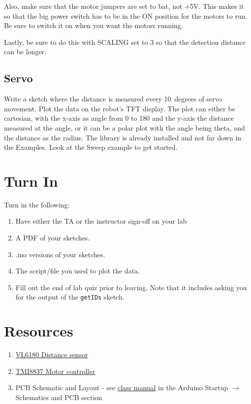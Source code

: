 Also, make sure that the motor jumpers are set to bat, not +5V. This makes it so that 
the big power switch has to be in the ON position for the motors to run. Be sure to 
switch it on when you want the motors running. 

Lastly, be sure to do this with SCALING set to 3 so that the detection distance can 
be longer.

\subsection{Servo}
Write a sketch where the distance is measured every 10~degrees of servo movement. Plot the
data on the robot's TFT display. The plot can either be cartesian, with the x-axis as angle
from 0 to 180 and the y-axis the distance measured at the angle, or it can be a polar plot 
with the angle being theta, and the distance as the radius. The \lstinline@Servo@ library 
is already installed and not far down in the Examples. Look at the Sweep example to get started.


\section{Turn In}
Turn in the following:
\begin{enumerate}
    \item Have either the TA or the instructor sign-off on your lab
    \item A PDF of your sketches.
    \item .ino versions of your sketches.
    \item The script/file you used to plot the data.
    \item Fill out the end of lab quiz prior to leaving. Note that it includes asking you 
            for the output of the \lstinline$getIDs$ sketch. 
\end{enumerate}

\section{Resources}\label{sec:distmotorservoresources}
\begin{enumerate}
    \item \href{https://www.st.com/resource/en/datasheet/vl6180.pdf}{VL6180 Distance sensor}
    \item \href{https://datasheet.lcsc.com/lcsc/2001060933_TMI-TMI8837_C478955.pdf}{TMI8837 Motor controller}
    \item PCB Schematic and Layout - see 
            \href{https://github.com/semcneil/Fundamentals-of-Microcontrollers-Manual}{class manual} 
            in the Arduino Startup $\rightarrow$ Schematics and PCB section
\end{enumerate}

